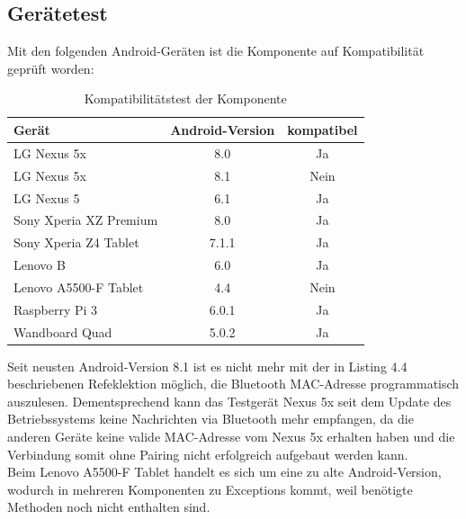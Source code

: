 \subsection{Gerätetest}
Mit den folgenden Android-Geräten ist die Komponente auf Kompatibilität geprüft worden:
\begin{table}[H]
	\begin{center}
		\caption{Kompatibilitätstest der Komponente}
		\label{tab:dimensions}
		\begin{tabular}{l|c|c} 			
			Gerät & Android-Version & kompatibel \\
			\hline
			LG Nexus 5x & 8.0 & Ja\\
			LG Nexus 5x & 8.1 & Nein\\
			LG Nexus 5 & 6.1 & Ja\\
			Sony Xperia XZ Premium & 8.0 & Ja\\
			Sony Xperia Z4 Tablet & 7.1.1 & Ja\\
			Lenovo B & 6.0 & Ja\\
			Lenovo A5500-F Tablet & 4.4 & Nein\\
			Raspberry Pi 3 & 6.0.1 & Ja\\	
			Wandboard Quad & 5.0.2 & Ja\\			
		\end{tabular}
	\end{center}
\end{table}
Seit neusten Android-Version 8.1 ist es nicht mehr mit der in Listing 4.4 beschriebenen Refeklektion möglich, die Bluetooth MAC-Adresse programmatisch auszulesen. Dementsprechend kann das Testgerät Nexus 5x seit dem Update des Betriebssystems keine Nachrichten via Bluetooth mehr empfangen, da die anderen Geräte keine valide MAC-Adresse vom Nexus 5x erhalten haben und die Verbindung somit ohne Pairing nicht erfolgreich aufgebaut werden kann. 
\\Beim Lenovo A5500-F Tablet handelt es sich um eine zu alte Android-Version, wodurch in mehreren Komponenten zu Exceptions kommt, weil benötigte Methoden noch nicht enthalten sind.


